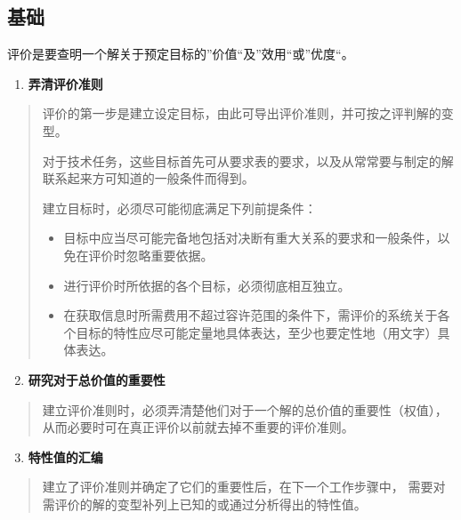 \documentclass[letterpaper,10pt,english]{sphinxmanual}
\begin{document}
\subsection{基础}
\label{unit5:id23}
评价是要查明一个解关于预定目标的”价值“及”效用“或”优度“。
\begin{enumerate}
\item {} 
\textbf{弄清评价准则}

\end{enumerate}
\begin{quote}

评价的第一步是建立设定目标，由此可导出评价准则，并可按之评判解的变型。

对于技术任务，这些目标首先可从要求表的要求，以及从常常要与制定的解联系起来方可知道的一般条件而得到。

建立目标时，必须尽可能彻底满足下列前提条件：
\begin{itemize}
\item {} 
目标中应当尽可能完备地包括对决断有重大关系的要求和一般条件，以免在评价时忽略重要依据。

\item {} 
进行评价时所依据的各个目标，必须彻底相互独立。

\item {} 
在获取信息时所需费用不超过容许范围的条件下，需评价的系统关于各个目标的特性应尽可能定量地具体表达，至少也要定性地（用文字）具体表达。

\end{itemize}
\end{quote}
\begin{enumerate}
\setcounter{enumi}{1}
\item {} 
\textbf{研究对于总价值的重要性}

\end{enumerate}
\begin{quote}

建立评价准则时，必须弄清楚他们对于一个解的总价值的重要性（权值），
从而必要时可在真正评价以前就去掉不重要的评价准则。
\end{quote}
\begin{enumerate}
\setcounter{enumi}{2}
\item {} 
\textbf{特性值的汇编}

\end{enumerate}
\begin{quote}

建立了评价准则并确定了它们的重要性后，在下一个工作步骤中，
需要对需评价的解的变型补列上已知的或通过分析得出的特性值。
\end{quote}
\end{document}
